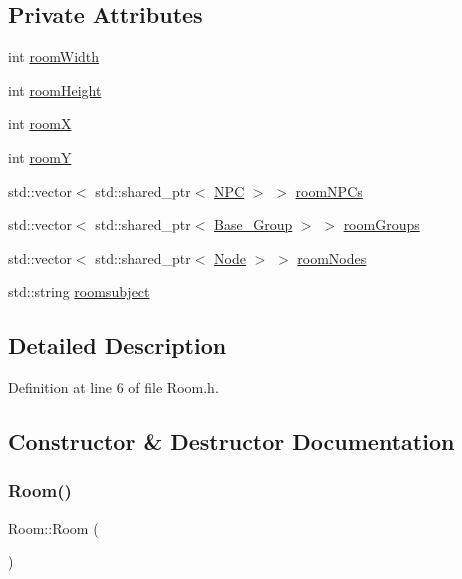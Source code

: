 \subsection*{Private Attributes}
\begin{DoxyCompactItemize}
\item 
int \hyperlink{class_room_a3538dc1a9a08a492cec337399db77259}{room\+Width}
\item 
int \hyperlink{class_room_a3f6fbe94c4c124e4c4df85e57fbb703b}{room\+Height}
\item 
int \hyperlink{class_room_a5cb7d8efa1ea04af080f7e2c041fea1a}{roomX}
\item 
int \hyperlink{class_room_a702c5d200cedc6e9eef5cbc2034fdc17}{roomY}
\item 
std\+::vector$<$ std\+::shared\+\_\+ptr$<$ \hyperlink{class_n_p_c}{N\+PC} $>$ $>$ \hyperlink{class_room_a34bdf24cc8c52d638bcfd851c295f23b}{room\+N\+P\+Cs}
\item 
std\+::vector$<$ std\+::shared\+\_\+ptr$<$ \hyperlink{class_base___group}{Base\+\_\+\+Group} $>$ $>$ \hyperlink{class_room_a2d63fa17f30d50dd5267f04170a662b0}{room\+Groups}
\item 
std\+::vector$<$ std\+::shared\+\_\+ptr$<$ \hyperlink{class_node}{Node} $>$ $>$ \hyperlink{class_room_adcf7b7bd55783c0e80b2508ce9485d78}{room\+Nodes}
\item 
std\+::string \hyperlink{class_room_a469d309dfc2c2693c27cbcb512f9c14c}{roomsubject}
\end{DoxyCompactItemize}


\subsection{Detailed Description}


Definition at line 6 of file Room.\+h.



\subsection{Constructor \& Destructor Documentation}
\mbox{\label{class_room_ac6ef93a7d9c3e1d624e025058d5f16ff}} 
\subsubsection{\texorpdfstring{Room()}{Room()}\hspace{0.1cm}{\footnotesize\ttfamily [1/2]}}
{\footnotesize\ttfamily Room\+::\+Room (\begin{DoxyParamCaption}{ }\end{DoxyParamCaption})}



